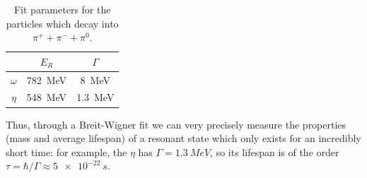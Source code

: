 \documentclass[10pt]{article}
\begin{document}
\begin{table}[H]
    \centering
    \begin{tabular}{c|c|c}
            & \(E_R\) &  \(\Gamma\) \\
            \hline
        \(\omega\) &  \SI{782}{MeV}  &   \SI{8}{MeV}    \\
        \hline
        \(\eta\) &  \SI{548}{MeV}    &   \SI{1.3}{MeV}    \\
    \end{tabular}
    \caption{Fit parameters for the particles which decay into \(\pi^+ + \pi^- + \pi^0 \).}
    \label{fig:decay-pi}
\end{table}

Thus, through a Breit-Wigner fit we can very precisely measure the properties (mass and average lifespan) of a resonant state which only exists for an incredibly short time: for example, the \(\eta\) has \(\Gamma=\SI{1.3}{MeV} \), so its lifespan is of the order \(\tau = \hbar/\Gamma \approx \SI{5e-22}{s}\).

%
%
%
%
%
%
\end{document}

